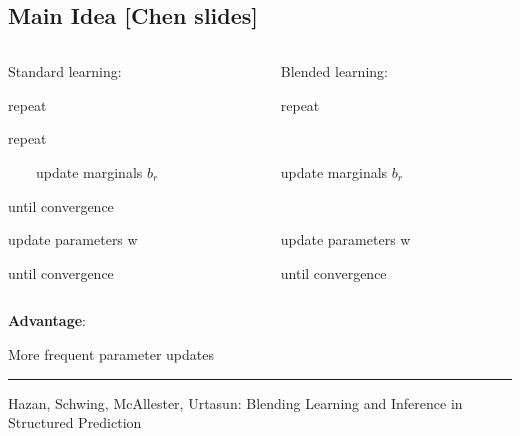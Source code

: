 \documentclass{beamer}
\begin{document}
\subsection*{Main Idea [Chen slides]}
\begin{frame}
	\begin{columns}[onlytextwidth]
		\begin{column}{0.48\textwidth}
			Standard learning: 
			\begin{tcolorbox}[colback=gray!20]
			repeat
					\begin{tcolorbox}[colback=red!10]
					repeat 
						
					~~~~update marginals $b_r$
						
					until convergence
					\end{tcolorbox}			
							
					\begin{tcolorbox}[colback=gray!30]
						update parameters w
					\end{tcolorbox}			
					until convergence
			\end{tcolorbox}
		\end{column}
		\begin{column}{0.48\textwidth}
			Blended learning:
			\begin{tcolorbox}[colback=gray!20]
				repeat
				\begin{tcolorbox}[colback=red!10]
					~~
					
					update marginals $b_r$
				
					~~
					\vspace{0.2cm}
				\end{tcolorbox}			
				
				\begin{tcolorbox}[colback=gray!30]
					update parameters w
				\end{tcolorbox}			
				until convergence
			\end{tcolorbox}
		\end{column}
	\end{columns}
	\bigskip
	
	\textbf{Advantage}: 
	
	\centering More frequent parameter updates
	
	\bigskip
	\hrule
	\bigskip
	{\scriptsize Hazan, Schwing, McAllester, Urtasun: Blending Learning and Inference in Structured Prediction}
\end{frame}
\end{document}
